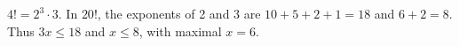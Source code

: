 $4!=2^3\cdot3$. In $20!$, the exponents of 2 and 3 are $10+5+2+1=18$ and $6+2=8$. Thus $3x\le18$ and $x\le8$, with maximal $\boxed{x=6}$.
